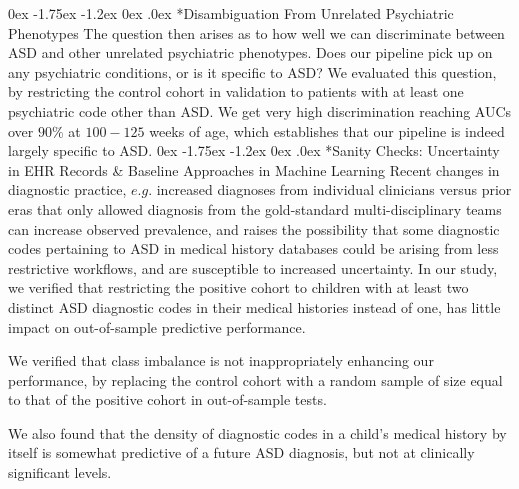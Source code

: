 \documentclass[onecolumn, compsoc,11pt]{IEEEtran}
\makeatletter
\renewcommand\subsection{\@startsection {subsection}{2}{\z@}%
                                   {0ex \@plus -1.75ex \@minus -1.2ex}%
                                   {0ex \@plus.0ex}%
                                   {\fontsize{11}{11}\selectfont\bfseries\sffamily\color{black}}}
\def\treatment{positive\xspace}
\makeatother
\begin{document}
\subsection*{Disambiguation From Unrelated Psychiatric Phenotypes}
%
 The  question then arises as to how well we can discriminate between ASD and other unrelated psychiatric phenotypes. Does our pipeline pick up on any psychiatric conditions, or is it specific to ASD? We  evaluated this question, by restricting the  control  cohort in validation to  patients with at least one psychiatric code other than ASD. We get very high discrimination reaching AUCs over $90\%$ at $100-125$ weeks of age, which establishes that our pipeline is indeed largely specific to ASD.
%
\subsection*{Sanity Checks: Uncertainty in EHR Records \& Baseline Approaches in Machine Learning}
Recent changes in diagnostic practice, $e.g.$ increased diagnoses from individual clinicians versus prior eras that only allowed diagnosis from the gold-standard multi-disciplinary teams can  increase observed   prevalence, and  raises the possibility that  some diagnostic codes pertaining to ASD in medical history databases could be arising from less restrictive workflows, and  are susceptible to increased uncertainty.  In our study, we verified that restricting the \treatment cohort to children with at least two  distinct ASD diagnostic codes in their medical histories instead of one, has little impact on  out-of-sample predictive performance.
 
We  verified that class imbalance is not inappropriately  enhancing our performance, by replacing  the  control cohort with a random sample of size equal to that of the \treatment cohort in out-of-sample tests.

We also found that the density of diagnostic codes in a child's medical history by itself is somewhat predictive of a future ASD diagnosis, but not at clinically significant levels.
\end{document}
